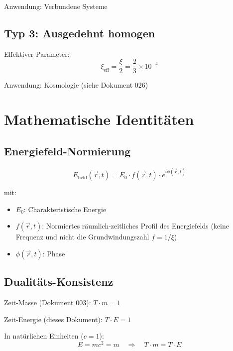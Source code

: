 	Anwendung: Verbundene Systeme
	
	\subsection{Typ 3: Ausgedehnt homogen}
	
	Effektiver Parameter:
	\begin{equation}
		\xi_{\text{eff}} = \frac{\xi}{2} = \frac{2}{3} \times 10^{-4}
	\end{equation}
	
	Anwendung: Kosmologie (siehe Dokument 026)
	
	\section{Mathematische Identitäten}
	\label{sec:identities}
	
	\subsection{Energiefeld-Normierung}
	
	\begin{equation}
		E_{\text{field}}(\vec{r}, t) = E_0 \cdot f(\vec{r}, t) \cdot e^{i\phi(\vec{r}, t)}
	\end{equation}

	mit:
	\begin{itemize}
		\item $E_0$: Charakteristische Energie
		\item $f(\vec{r}, t)$: Normiertes räumlich-zeitliches Profil des Energiefelds (keine Frequenz und nicht die Grundwindungszahl $f = 1/\xi$)
		\item $\phi(\vec{r}, t)$: Phase
	\end{itemize}
	
	\subsection{Dualitäts-Konsistenz}
	
	Zeit-Masse (Dokument 003): $T \cdot m = 1$
	
	Zeit-Energie (dieses Dokument): $T \cdot E = 1$
	
	In natürlichen Einheiten ($c = 1$):
	\begin{equation}
		E = mc^2 = m \quad \Rightarrow \quad T \cdot m = T \cdot E
	\end{equation}
	
